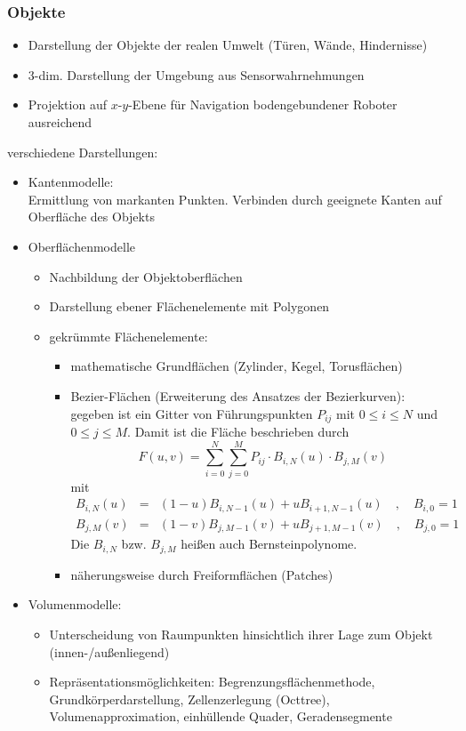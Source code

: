 \subsubsection*{Objekte}

\begin{itemize}
\item Darstellung der Objekte der realen Umwelt (Türen, Wände, Hindernisse)
\item 3-dim. Darstellung der Umgebung aus Sensorwahrnehmungen
\item Projektion auf $x$-$y$-Ebene für Navigation bodengebundener Roboter ausreichend
\end{itemize}
verschiedene Darstellungen:
\begin{itemize}
\item Kantenmodelle: \\
Ermittlung von markanten Punkten. Verbinden durch geeignete Kanten auf Oberfläche des Objekts
\item Oberflächenmodelle
\begin{itemize}
\item Nachbildung der Objektoberflächen
\item Darstellung ebener Flächenelemente mit Polygonen
\item gekrümmte Flächenelemente:
\begin{itemize}
\item mathematische Grundflächen (Zylinder, Kegel, Torusflächen)
\item Bezier-Flächen (Erweiterung des Ansatzes der Bezierkurven): \\
gegeben ist ein Gitter von Führungspunkten $P_{ij}$ mit $0 \leq i \leq N$ und $0 \leq j \leq M$. Damit ist die Fläche beschrieben durch $$F(u,v) = \sum\limits_{i=0}^N \sum\limits_{j=0}^M P_{ij} \cdot B_{i,N}(u) \cdot B_{j,M}(v)$$ mit
\begin{eqnarray*}
B_{i,N}(u) &=& (1-u) B_{i,N-1}(u) + uB_{i+1,N-1}(u) \quad , \quad B_{i,0} = 1 \\
B_{j,M}(v) &=& (1-v) B_{j,M-1}(v) + uB_{j+1,M-1}(v) \quad , \quad B_{j,0} = 1
\end{eqnarray*}
Die $B_{i,N}$ bzw. $B_{j,M}$ heißen auch Bernsteinpolynome.
\item näherungsweise durch Freiformflächen (Patches)
\end{itemize}
\end{itemize}
\item Volumenmodelle:
\begin{itemize}
\item Unterscheidung von Raumpunkten hinsichtlich ihrer Lage zum Objekt (innen-/außenliegend)
\item Repräsentationsmöglichkeiten: Begrenzungsflächenmethode, Grundkörperdarstellung, Zellenzerlegung (Octtree), Volumenapproximation, einhüllende Quader, Geradensegmente
\end{itemize}
\end{itemize}

